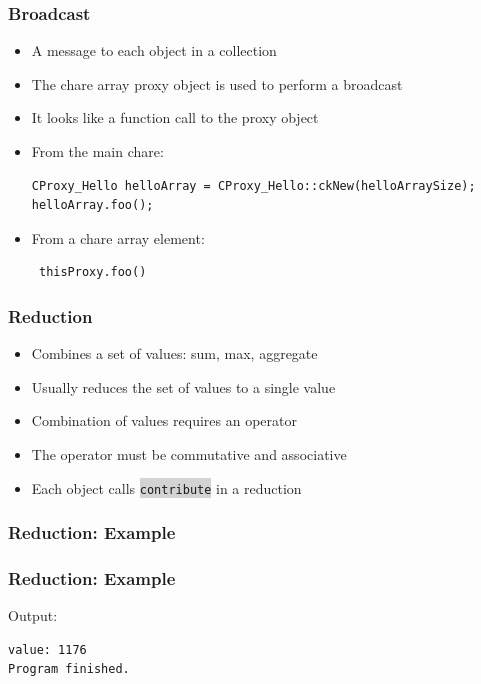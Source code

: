 \documentclass{beamer}
\newcommand{\code}[1]{\colorbox{lightgray}{\texttt{#1}}}
\begin{document}
\begin{frame}[fragile]
  \frametitle{Broadcast}
  \begin{itemize}
    \item A message to each object in a collection
    \item The chare array proxy object is used to perform a broadcast
    \item It looks like a function call to the proxy object
    \item From the main chare:
    \begin{lstlisting}
CProxy_Hello helloArray = CProxy_Hello::ckNew(helloArraySize);
helloArray.foo();
    \end{lstlisting}
    \item From a chare array element:
     \begin{lstlisting}
 thisProxy.foo()
    \end{lstlisting}
  \end{itemize}
\end{frame}

\begin{frame}[fragile]
  \frametitle{Reduction}
  \begin{itemize}
  \item Combines a set of values: sum, max, aggregate
  \item Usually reduces the set of values to a single value
  \item Combination of values requires an operator
  \item The operator must be commutative and associative
  \item Each object calls \code{contribute} in a reduction
  \end{itemize}
\end{frame}

\begin{frame}[fragile]
  \frametitle{Reduction: Example}
  
\end{frame}

\begin{frame}[fragile]
  \frametitle{Reduction: Example}
  
Output:
  \begin{lstlisting}[basicstyle=\tiny]
value: 1176
Program finished.
  \end{lstlisting}
\end{frame}


%     
\end{document}
